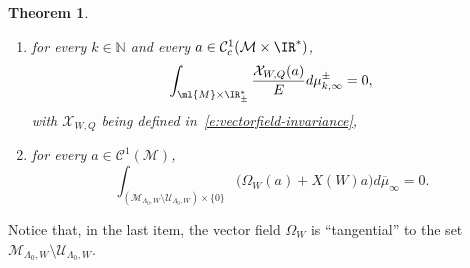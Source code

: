 \documentclass[10pt]{amsart}
\theoremstyle{plain}
\newtheorem{theo}{Theorem}[section]
\theoremstyle{definition}
\theoremstyle{remark}
\begin{document}
\begin{theo}
\begin{enumerate}
\item
\label{i:invariance_2} for every $k \in \mathbb{N}$ and every $a \in \mathcal{C}^1_c(\mathcal{M}\times\IR^*)$,
\[
\int_{\ml{M}\times\IR_\pm^*} \frac{\mathcal{X}_{W,Q} (a)}{E} d\mu^\pm_{k,\infty} = 0,
\]
with $\mathcal{X}_{W,Q}$ being defined in~\eqref{e:vectorfield-invariance},
\item
\label{i:invariance_3} for every $a \in \mathcal{C}^1(\mathcal{M})$,
\[
\int_{(\mathcal{M}_{\Lambda_0,W}\setminus\mathcal{U}_{\Lambda_0,W})\times\{0\}} \big(\Omega_{W}(a)+X(W)a\big) d\overline{\mu}_{\infty} = 0.
\]
\end{enumerate}
\end{theo}


Notice that, in the last item, the vector field $\Omega_W$ is ``tangential'' to the set $\mathcal{M}_{\Lambda_0,W}\setminus\mathcal{U}_{\Lambda_0,W}$.
\end{document}

